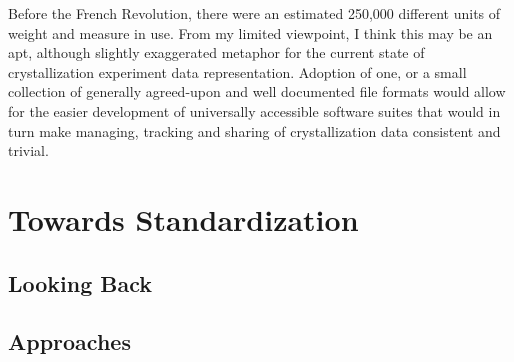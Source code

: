 \documentclass[]{article}
\begin{document}
Before the French Revolution, there were an estimated 250,000 different units of weight and measure in use. From my limited viewpoint, I think this may be an apt, although slightly exaggerated metaphor for the current state of crystallization experiment data representation. Adoption of one, or a small collection of generally agreed-upon and well documented file formats would allow for the easier development of universally accessible software suites that would in turn make managing, tracking and sharing of crystallization data consistent and trivial.

\section{Towards Standardization}

\subsection{Looking Back}

\subsection{Approaches}




\end{document}

